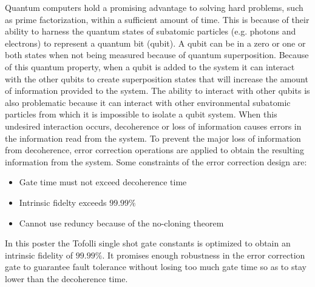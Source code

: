  Quantum computers hold a promising advantage to solving hard problems, such as prime factorization, within a sufficient amount of time. This is because of their ability to harness the quantum states of subatomic particles (e.g. photons and electrons) to represent a quantum bit (qubit). A qubit can be in a zero or one or both states when not being measured because of quantum superposition. Because of this quantum property, when a qubit is added to the system it can interact with the other qubits
 to create superposition states that will increase the amount of information provided to the system. The ability to interact with other qubits is also problematic because it can interact with other environmental subatomic particles from which it is impossible to isolate a qubit system. When this undesired interaction occurs, decoherence or loss of information causes errors in the information read from the system. To prevent the major loss of information from decoherence, error correction operations are applied to obtain the resulting information from the system. Some
constraints of the error correction design are:
\begin{itemize}
  \item Gate time must not exceed decoherence time
  \item Intrinsic fidelty exceeds $99.99\%$
  \item Cannot use reduncy because of the no-cloning theorem
  \end{itemize}

In this poster the Tofolli single shot gate constants is optimized to obtain an intrinsic fidelity of $99.99\%$. It promises enough robustness in the error correction gate to guarantee fault tolerance without losing too much gate time so as to stay lower than the decoherence time. 
